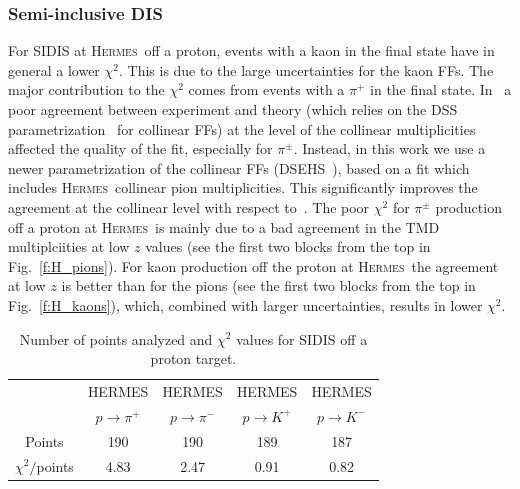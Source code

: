 \documentclass[aps,preprintnumbers,showpacs,nofootinbib,superscriptaddress,floatfix]{revtex4}
\newcommand{\hermes}{\textsc{Hermes}}
\begin{document}
\subsubsection*{Semi-inclusive DIS}
\label{sss:SIDIS_agreement}


For SIDIS at \hermes\ off a proton, events with a kaon in the final state have in general a lower $\chi^2$. This is due to the large uncertainties for the kaon FFs. 
The major contribution to the $\chi^2$ comes from events with a $\pi^+$ in the final state. 
In~\cite{Signori:2013mda,Signori:2013gra} a poor agreement between experiment and theory (which relies on the DSS parametrization~\cite{deFlorian:2007aj} for collinear FFs) at the level of the collinear multiplicities affected the quality of the fit, especially for $\pi^\pm$. Instead, in this work we use a newer parametrization of the collinear FFs (DSEHS~\cite{deFlorian:2014xna}), based on a fit which includes \hermes\ collinear pion multiplicities. This significantly improves the agreement at the collinear level with respect to~\cite{Signori:2013mda,Signori:2013gra}. 
The poor $\chi^2$ for $\pi^\pm$ production off a proton at \hermes\ is mainly due to a bad agreement in the TMD multiplciities at low $z$ values (see the first two blocks from the top in Fig.~\ref{f:H_pions}). 
For kaon production off the proton at \hermes\ the agreement at low $z$ is better than for the pions (see the first two blocks from the top in Fig.~\ref{f:H_kaons}), which, combined with larger uncertainties, results in lower $\chi^2$.
\begin{table}[h!]
\begin{center}
\begin{tabular}{|c|c|c|c|c|}
 \hline
\hline
  & HERMES & HERMES & HERMES & HERMES \\   
 &  $p \to \pi^+$    &   $p \to \pi^-$    &  $p \to K^+$    &   $p \to K^-$
 \\
 \hline
 Points         &  190 & 190 & 189 & 187       \\
 \hline
$\chi^2 /$points &4.83 & 2.47 & 0.91 & 0.82   \\            
\hline
\hline
\end{tabular}
\caption{Number of points analyzed and $\chi^2$ values for SIDIS off a proton target.}
\label{t:fl_ind_chi2_eP}
\end{center}
\end{table}
\end{document}

